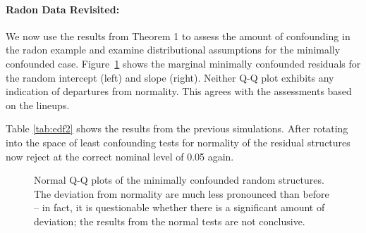 \documentclass[12pt]{article} %
\begin{document}
\clearpage
\paragraph{Radon Data Revisited:}
We now use the results from Theorem 1 to assess the amount of confounding in the radon example and examine distributional assumptions for the minimally confounded case.
Figure~\ref{fig:lcqq} shows the marginal minimally confounded residuals for the random intercept (left) and slope (right). Neither Q-Q plot exhibits any indication of departures from normality. This agrees with the assessments based on the lineups. 

Table \ref{tab:edf2} shows the results from the previous simulations. After rotating into the space of least confounding tests for normality of the residual structures now  reject at the correct nominal level of 0.05 again.


\begin{figure}[htb]
	\centering
	\caption{\label{fig:lcqq} Normal Q-Q plots of the minimally confounded random structures. The deviation from normality are much less pronounced than before -- in fact, it is questionable whether there is a significant amount of deviation; the results from the normal tests are not conclusive.}
\end{figure}
\end{document}
